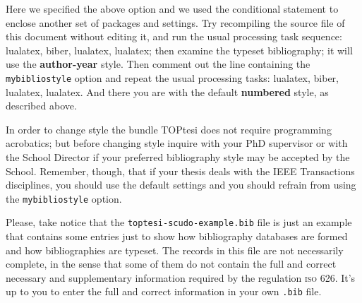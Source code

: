 Here we specified the above option and we used the conditional statement to enclose another set of packages and settings. Try recompiling the source file of this document without editing it, and run the usual processing task  sequence: lualatex, biber, lualatex, lualatex; then examine the typeset bibliography; it will use the \textbf{author-year} style.
Then comment out the line containing the \texttt{mybibliostyle} option and repeat the usual processing tasks: lualatex, biber, lualatex, lualatex. And there you are with the default \textbf{numbered} style, as described above.

In order to change style the bundle TOPtesi does not require programming acrobatics; but before changing style inquire with your PhD supervisor or with the School Director if your preferred bibliography style may be accepted by the School. Remember, though, that if your thesis deals with the IEEE Transactions disciplines, you should use the default settings and you should refrain from using the \texttt{mybibliostyle} option.

Please, take notice that the \texttt{toptesi-scudo-example.bib} file is just an example that contains some entries just to show how bibliography databases are formed and how bibliographies are typeset. The records in this file are not necessarily complete, in the sense that some of them do not contain the full and correct necessary and supplementary information required by the regulation \textsc{iso 626}. It's up to you to enter the full and correct information in your own \texttt{.bib} file.



